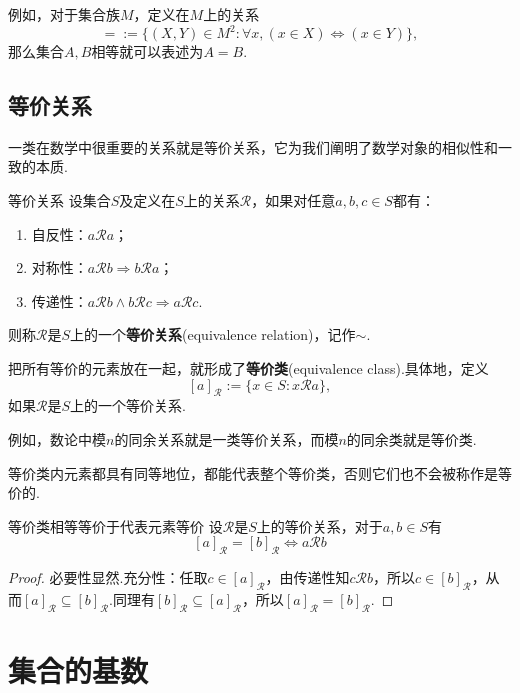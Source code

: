 \documentclass[lang=cn, zihao=5]{elegantbook}
\begin{document}
例如，对于集合族$M$，定义在$M$上的关系$$\boldsymbol{=} := \{ (X,Y) \in M^2 : \forall x,(x \in X) \Leftrightarrow (x \in Y) \},$$
那么集合$A,B$相等就可以表述为$A \boldsymbol{=} B$.

\subsection{等价关系}

一类在数学中很重要的关系就是等价关系，它为我们阐明了数学对象的相似性和一致的本质.

\begin{definition}{等价关系}
	设集合$S$及定义在$S$上的关系$\mathcal{R}$，如果对任意$a,b,c \in S$都有：
	\begin{enumerate}
		\item 自反性：$a\mathcal{R} a$；
		\item 对称性：$a\mathcal{R} b \Rightarrow b\mathcal{R} a$；
		\item 传递性：$a\mathcal{R} b \wedge b\mathcal{R} c \Rightarrow a\mathcal{R} c$.
	\end{enumerate}
	则称$\mathcal{R}$是$S$上的一个\textbf{等价关系}(equivalence relation)，记作$\sim$.
\end{definition}

把所有等价的元素放在一起，就形成了\textbf{等价类}(equivalence class).具体地，定义$$[a]_{\mathcal{R}} := \{ x \in S:x\mathcal{R}a \},$$如果$\mathcal{R}$是$S$上的一个等价关系.

例如，数论中模$n$的同余关系就是一类等价关系，而模$n$的同余类就是等价类.

等价类内元素都具有同等地位，都能代表整个等价类，否则它们也不会被称作是等价的.

\begin{proposition}{等价类相等等价于代表元素等价}
	设$\mathcal{R}$是$S$上的等价关系，对于$a,b \in S$有$$[a]_{\mathcal{R}} = [b]_{\mathcal{R}} \Leftrightarrow a\mathcal{R} b$$
\end{proposition}
\begin{proof}
	必要性显然.充分性：任取$c \in [a]_{\mathcal{R}}$，由传递性知$c \mathcal{R} b$，所以$c \in [b]_{\mathcal{R}}$，从而$[a]_{\mathcal{R}} \subseteq [b]_{\mathcal{R}}$.同理有$[b]_{\mathcal{R}} \subseteq [a]_{\mathcal{R}}$，所以$[a]_{\mathcal{R}} = [b]_{\mathcal{R}}$.
\end{proof}



\section{集合的基数}
\end{document}
